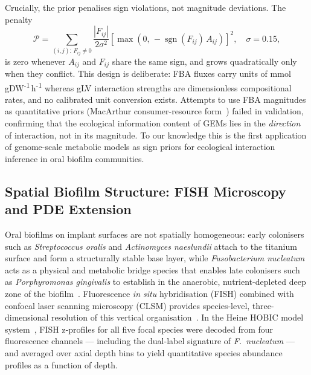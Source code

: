 Crucially, the prior penalises sign violations, not magnitude deviations.
The penalty
\begin{equation}
    \mathcal{P} = \sum_{(i,j):\, F_{ij} \neq 0}
    \frac{|F_{ij}|}{2\sigma^{2}}
    \!\left[\max\!\left(0,\,-\operatorname{sgn}(F_{ij})\,A_{ij}\right)\right]^{2},
    \quad \sigma = 0.15,
    \label{eq:sign_penalty}
\end{equation}
is zero whenever $A_{ij}$ and $F_{ij}$ share the same sign, and grows quadratically
only when they conflict.
This design is deliberate: FBA fluxes carry units of
mmol\,gDW\textsuperscript{-1}\,h\textsuperscript{-1} whereas gLV interaction strengths
are dimensionless compositional rates, and no calibrated unit conversion exists.
Attempts to use FBA magnitudes as quantitative priors (MacArthur consumer-resource
form~\cite{Marsland2019MicrobialCRM}) failed in validation, confirming that the
ecological information content of GEMs lies in the \emph{direction} of interaction,
not in its magnitude.
To our knowledge this is the first application of genome-scale metabolic models as
sign priors for ecological interaction inference in oral biofilm communities.

\subsection{Spatial Biofilm Structure: FISH Microscopy and PDE Extension}
\label{sec:intro_spatial}

Oral biofilms on implant surfaces are not spatially homogeneous: early colonisers
such as \textit{Streptococcus oralis} and \textit{Actinomyces naeslundii} attach
to the titanium surface and form a structurally stable base layer, while
\textit{Fusobacterium nucleatum} acts as a physical and metabolic bridge species
that enables late colonisers such as \textit{Porphyromonas gingivalis} to
establish in the anaerobic, nutrient-depleted deep zone of the
biofilm~\cite{Kolenbrander2010OralMultispecies, Signat2011Fn}.
Fluorescence \textit{in situ} hybridisation (FISH) combined with confocal laser
scanning microscopy (CLSM) provides species-level, three-dimensional resolution
of this vertical organisation~\cite{Manders1993Colocalization}.
In the Heine HOBIC model system~\cite{Heine2025PeriImplant, Kommerein2018HOBIC},
FISH z-profiles for all five focal species were decoded from four fluorescence
channels --- including the dual-label signature of \textit{F.~nucleatum} ---
and averaged over axial depth bins to yield quantitative species abundance profiles
as a function of depth.

